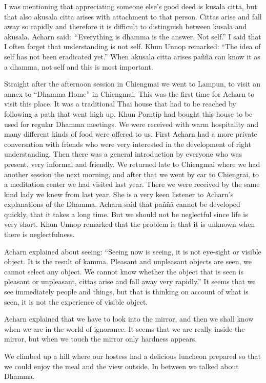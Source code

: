 I was mentioning that appreciating someone else's good deed is kusala
citta, but that also akusala citta arises with attachment to that
person. Cittas arise and fall away so rapidly and therefore it is
difficult to distinguish between kusala and akusala. Acharn
said:~``Everything is dhamma is the answer. Not self.'' I said that I
often forget that understanding is not self. Khun Unnop remarked: ``The
idea of self has not been eradicated yet.'' When akusala citta arises
paññā can know it as a dhamma, not self and this is most important.

Straight after the afternoon session in Chiengmai we went to Lampun, to
visit an annex to ``Dhamma Home'' in Chiengmai. This was the first time
for Acharn to visit this place. It was a traditional Thai house that had
to be reached by following a path that went high up. Khun Porntip had
bought this house to be used for regular Dhamma meetings. We were
received with warm hospitality and many different kinds of food were
offered to us. First Acharn had a more private conversation with friends
who were very interested in the development of right understanding. Then
there was a general introduction by everyone who was present, very
informal and friendly. We returned late to Chiengmai where we had
another session the next morning, and after that we went by car to
Chiengrai, to a meditation center we had visited last year. There we
were received by the same kind lady we knew from last year. She is a
very keen listener to Acharn's explanations of the Dhamma. Acharn said
that paññā cannot be developed quickly, that it takes a long time. But
we should not be neglectful since life is very short. Khun Unnop
remarked that the problem is that it is unknown when there is
neglectfulness.

Acharn explained about seeing: ``Seeing now is seeing, it is not
eye-sight or visible object. It is the result of kamma. Pleasant and
unpleasant objects are seen, we cannot select any object. We cannot know
whether the object that is seen is pleasant or unpleasant, cittas arise
and fall away very rapidly.'' It seems that we see immediately people
and things, but that is thinking on account of what is seen, it is not
the experience of visible object.

Acharn explained that we have to look into the mirror, and then we shall
know when we are in the world of ignorance. It seems that we are really
inside the mirror, but when we touch the mirror only hardness appears.

We climbed up a hill where our hostess had a delicious luncheon prepared
so that we could enjoy the meal and the view outside. In between we
talked about Dhamma.

